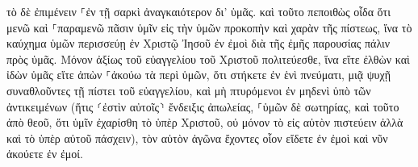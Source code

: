 \documentclass{openreader}
\begin{document}
τὸ δὲ ἐπιμένειν ⸀ἐν τῇ σαρκὶ ἀναγκαιότερον δι’ ὑμᾶς. 
καὶ τοῦτο πεποιθὼς οἶδα ὅτι μενῶ καὶ ⸀παραμενῶ πᾶσιν ὑμῖν εἰς τὴν ὑμῶν προκοπὴν καὶ χαρὰν τῆς πίστεως, 
ἵνα τὸ καύχημα ὑμῶν περισσεύῃ ἐν Χριστῷ Ἰησοῦ ἐν ἐμοὶ διὰ τῆς ἐμῆς παρουσίας πάλιν πρὸς ὑμᾶς. 
Μόνον ἀξίως τοῦ εὐαγγελίου τοῦ Χριστοῦ πολιτεύεσθε, ἵνα εἴτε ἐλθὼν καὶ ἰδὼν ὑμᾶς εἴτε ἀπὼν ⸀ἀκούω τὰ περὶ ὑμῶν, ὅτι στήκετε ἐν ἑνὶ πνεύματι, μιᾷ ψυχῇ συναθλοῦντες τῇ πίστει τοῦ εὐαγγελίου, 
καὶ μὴ πτυρόμενοι ἐν μηδενὶ ὑπὸ τῶν ἀντικειμένων (ἥτις ⸂ἐστὶν αὐτοῖς⸃ ἔνδειξις ἀπωλείας, ⸀ὑμῶν δὲ σωτηρίας, καὶ τοῦτο ἀπὸ θεοῦ, 
ὅτι ὑμῖν ἐχαρίσθη τὸ ὑπὲρ Χριστοῦ, οὐ μόνον τὸ εἰς αὐτὸν πιστεύειν ἀλλὰ καὶ τὸ ὑπὲρ αὐτοῦ πάσχειν), 
τὸν αὐτὸν ἀγῶνα ἔχοντες οἷον εἴδετε ἐν ἐμοὶ καὶ νῦν ἀκούετε ἐν ἐμοί. 
\end{document}
